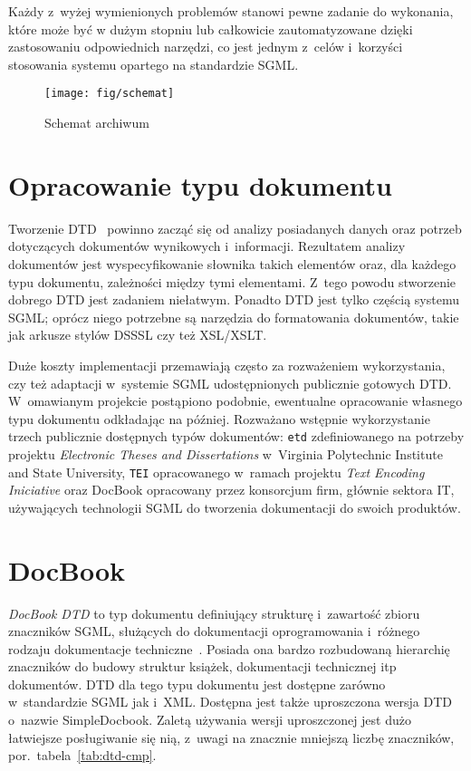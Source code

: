 \documentclass[brudnopis]{xmgr}
\begin{document}
Każdy z~wyżej wymienionych problemów stanowi pewne zadanie do
wykonania, które może być w dużym stopniu lub całkowicie
zautomatyzowane dzięki zastosowaniu odpowiednich narzędzi, co jest
jednym z~celów i~korzyści stosowania systemu opartego na standardzie
SGML.

\begin{figure}[!tbh]
\centering 
\texttt{[image: fig/schemat]}
\caption{Schemat archiwum\label{RYS.2}}
\end{figure}

\section{Opracowanie typu dokumentu\label{s:dtd}}
Tworzenie DTD~\cite{Eisenberg:2002:SXM,Goldfarb:2002:CFG} powinno zacząć się
od analizy posiadanych danych oraz potrzeb dotyczących dokumentów
wynikowych i~informacji. Rezultatem analizy dokumentów jest
wyspecyfikowanie słownika takich elementów oraz, dla każdego typu
dokumentu, zależności między tymi elementami. Z~tego powodu stworzenie
dobrego DTD jest zadaniem niełatwym. Ponadto DTD jest tylko częścią
systemu SGML; oprócz niego potrzebne są narzędzia do formatowania
dokumentów, takie jak arkusze stylów DSSSL czy też XSL/XSLT.
    
Duże koszty implementacji przemawiają często za rozważeniem
wykorzystania, czy też adaptacji w~systemie SGML udostępnionych
publicznie gotowych DTD. W~omawianym projekcie postąpiono podobnie,
ewentualne opracowanie własnego typu dokumentu odkładając na później.
Rozważano wstępnie wykorzystanie trzech publicznie dostępnych typów
dokumentów: \texttt{etd} zdefiniowanego na potrzeby projektu
\textit{Electronic Theses and Dissertations} w~Virginia Polytechnic
Institute and State University, \texttt{TEI} opracowanego w~ramach
projektu \textit{Text Encoding Iniciative} oraz
DocBook opracowany przez konsorcjum firm, głównie sektora IT,
używających technologii SGML do tworzenia dokumentacji do swoich
produktów.
    
\section{DocBook}
\emph{DocBook DTD} to typ dokumentu definiujący
strukturę i~zawartość zbioru znaczników SGML, służących do
dokumentacji oprogramowania i~różnego rodzaju dokumentacje
techniczne~\cite[s.~123]{Elmasri:2002:CMC}. Posiada ona bardzo rozbudowaną
hierarchię znaczników do budowy struktur książek, dokumentacji
technicznej itp dokumentów.  DTD dla tego typu dokumentu jest dostępne
zarówno w~standardzie SGML jak i~XML. Dostępna jest także uproszczona
wersja DTD o~nazwie SimpleDocbook. Zaletą używania wersji uproszczonej
jest dużo łatwiejsze posługiwanie się nią, z~uwagi na znacznie
mniejszą liczbę znaczników, por.~tabela~\ref{tab:dtd-cmp}.
\end{document}
